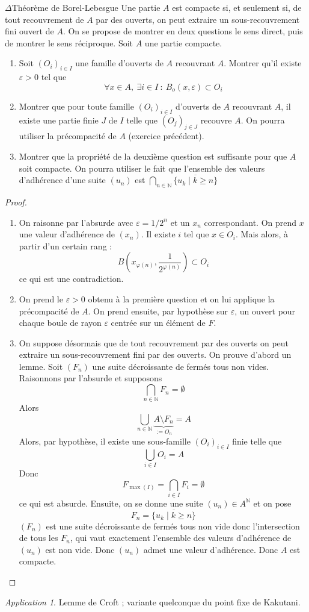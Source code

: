 \documentclass[french,a4paper]{article}
\newcommand{\N}{\mathbb{N}}
\theoremstyle{plain}
\theoremstyle{definition}
\theoremstyle{remark}
\newtheorem*{app}{Application}
\begin{document}
\begin{ex}[Moulin.32]{$\Delta$Théorème de Borel-Lebesgue} Une partie $A$ est compacte si, et seulement si, de tout recouvrement de $A$ par des ouverts, on peut extraire un sous-recouvrement fini ouvert de $A$. On se propose de montrer en deux questions le sens direct, puis de montrer le sens réciproque. Soit $A$ une partie compacte.
	\begin{enumerate}
		\item Soit $(O_i)_{i\in I}$ une famille d'ouverts de $A$ recouvrant $A$. Montrer qu'il existe $\varepsilon>0$ tel que $$\forall x\in A,\ \exists i\in I\ : \ B_o(x,\varepsilon)\subset O_i$$
		\item Montrer que pour toute famille $(O_i)_{i\in I}$ d'ouverts de $A$ recouvrant $A$, il existe une partie finie $J$ de $I$ telle que $(O_j)_{j\in J}$ recouvre $A$. On pourra utiliser la précompacité de $A$ (exercice précédent).
		\item Montrer que la propriété de la deuxième question est suffisante pour que $A$ soit compacte. On pourra utiliser le fait que l'ensemble des valeurs d'adhérence d'une suite $(u_n)$ est $\displaystyle\bigcap_{n\in\N}\overline{\{u_k\mid k\geqslant n\}}$
	\end{enumerate}
\end{ex}
\begin{proof}
	\begin{enumerate}
		\item On raisonne par l'absurde avec $\varepsilon=1/2^n$ et un $x_n$ correspondant. On prend $x$ une valeur d'adhérence de $(x_n)$. Il existe $i$ tel que $x\in O_i$. Mais alors, à partir d'un certain rang : $$B\left(x_{\varphi(n)},\frac{1}{2^{\varphi(n)}}\right)\subset O_i$$ ce qui est une contradiction.
		\item On prend le $\varepsilon>0$ obtenu à la première question et on lui applique la précompacité de $A$. On prend ensuite, par hypothèse sur $\varepsilon$, un ouvert pour chaque boule de rayon $\varepsilon$ centrée sur un élément de $F$.
		\item On suppose désormais que de tout recouvrement par des ouverts on peut extraire un sous-recouvrement fini par des ouverts. On prouve d'abord un lemme. Soit $(F_n)$ une suite décroissante de fermés tous non vides. Raisonnons par l'absurde et supposons $$\bigcap_{n\in\N} F_n=\emptyset$$ Alors $$\bigcup_{n\in\N}\underbrace{A\setminus F_n}_{:=O_n}=A$$ Alors, par hypothèse, il existe une sous-famille $(O_i)_{i\in I}$ finie telle que $$\bigcup_{i\in I}O_i=A$$ Donc $$F_{\max(I)}=\bigcap_{i\in I}F_i=\emptyset$$ ce qui est absurde. Ensuite, on se donne une suite $(u_n)\in A^\N$ et on pose $$F_n=\overline{\{u_k\mid k\geqslant n\}}$$ $(F_n)$ est une suite décroissante de fermés tous non vide donc l'intersection de tous les $F_n$, qui vaut exactement l'ensemble des valeurs d'adhérence de $(u_n)$ est non vide. Donc $(u_n)$ admet une valeur d'adhérence. Donc $A$ est compacte.
	\end{enumerate}
\end{proof}
\begin{app}
	Lemme de Croft ; variante quelconque du point fixe de Kakutani.
\end{app}
\end{document}
